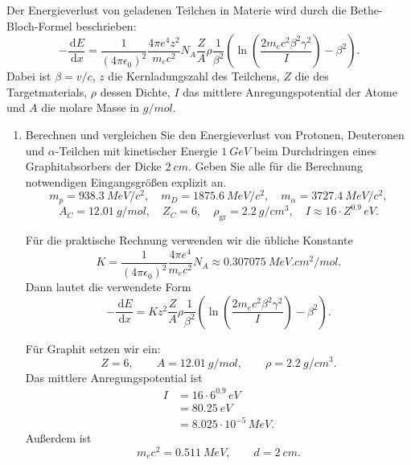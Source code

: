 \documentclass[11pt,a4paper]{scrartcl}
\newcommand{\dd}{\,\mathrm{d}}
\begin{document}
    Der Energieverlust von geladenen Teilchen in Materie wird durch die Bethe-Bloch-Formel
    beschrieben:
    \[
        -\frac{\dd E}{\dd x}
        =\frac{1}{(4\pi\epsilon_0)^2}\frac{4\pi e^4z^2}{m_ec^2}
        N_A\frac{Z}{A}\rho\frac{1}{\beta^2}
        \left(
            \ln\left(\frac{2m_ec^2\beta^2\gamma^2}{I}\right)-\beta^2
        \right).
    \]
    Dabei ist $\beta=v/c$, $z$ die Kernladungszahl des Teilchens, $Z$ die des
    Targetmaterials, $\rho$ dessen Dichte, $I$ das mittlere Anregungspotential der Atome
    und $A$ die molare Masse in $\si{g/mol}$.

    \begin{enumerate}[label=(\alph*)]
        \item
            Berechnen und vergleichen Sie den Energieverlust von Protonen, Deuteronen und
            $\alpha$-Teilchen mit kinetischer Energie $\SI{1}{GeV}$ beim Durchdringen eines
            Graphitabsorbers der Dicke $\SI{2}{cm}$. Geben Sie alle für die Berechnung
            notwendigen Eingangsgrößen explizit an.
            \[
                m_p=\SI{938.3}{MeV/c^2},\quad
                m_D=\SI{1875.6}{MeV/c^2},\quad
                m_{\alpha}=\SI{3727.4}{MeV/c^2},
            \]
            \[
                A_C=\SI{12.01}{g/mol},\quad
                Z_C=6,\quad
                \rho_{\mathrm{gr}}=\SI{2.2}{g/cm^3},\quad
                I\approx 16\cdot Z^{0.9}\,\si{eV}.
            \]

            \begin{calculationbox}
                Für die praktische Rechnung verwenden wir die übliche Konstante
                \[
                    K=\frac{1}{(4\pi\epsilon_0)^2}\frac{4\pi e^4}{m_ec^2}N_A
                    \approx \SI{0.307075}{MeV.cm^2/mol}.
                \]
                Dann lautet die verwendete Form
                \[
                    -\frac{\dd E}{\dd x}
                    =Kz^2\frac{Z}{A}\rho\frac{1}{\beta^2}
                    \left(
                        \ln\left(\frac{2m_ec^2\beta^2\gamma^2}{I}\right)-\beta^2
                    \right).
                \]

                \begin{calculationbox}
                    Für Graphit setzen wir ein:
                    \[
                        Z=6,
                        \qquad
                        A=\SI{12.01}{g/mol},
                        \qquad
                        \rho=\SI{2.2}{g/cm^3}.
                    \]
                    Das mittlere Anregungspotential ist
                    \begin{align*}
                        I&=16\cdot 6^{0.9}\,\si{eV}\\
                        &=\SI{80.25}{eV}\\
                        &=8.025\cdot10^{-5}\,\si{MeV}.
                    \end{align*}
                    Außerdem ist
                    \[
                        m_ec^2=\SI{0.511}{MeV},
                        \qquad
                        d=\SI{2}{cm}.
                    \]
                \end{calculationbox}


\end{calculationbox}
\end{enumerate}
\end{document}

